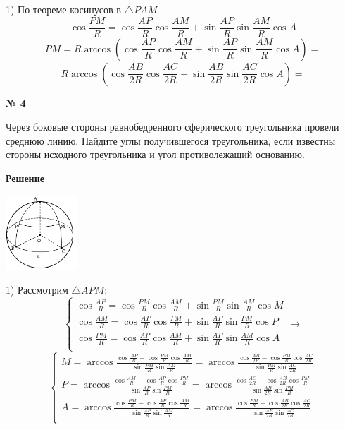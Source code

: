     1) По теореме косинусов в $\triangle PAM$
    \[
        \cos \frac{PM}{R} = \cos \frac{AP}{R}\cos\frac{AM}{R} + \sin\frac{AP}{R}\sin\frac{AM}{R}\cos A
    \]
    \[
        PM = R\arccos \left(\cos \frac{AP}{R}\cos\frac{AM}{R} + \sin\frac{AP}{R}\sin\frac{AM}{R}\cos A\right) =
    \]
    \[
        R\arccos \left(\cos \frac{AB}{2R}\cos\frac{AC}{2R} + \sin\frac{AB}{2R}\sin\frac{AC}{2R}\cos A\right) =
    \]

    \begin{center}
        \textbf{№ 4}
    \end{center}

    Через боковые стороны равнобедренного сферического треугольника провели среднюю линию.
    Найдите углы получившегося треугольника, если известны стороны исходного треугольника и угол противолежащий основанию.

    \textbf{Решение}\\

    \begin{center}
        \includegraphics[width=0.2\textwidth]{images/img6}\\
    \end{center}

    1) Рассмотрим $\triangle APM$:
    \[
        \begin{cases}
            \cos \frac{AP}{R} = \cos \frac{PM}{R}\cos\frac{AM}{R} + \sin \frac{PM}{R}\sin\frac{AM}{R}\cos M\\
            \cos \frac{AM}{R} = \cos \frac{AP}{R}\cos\frac{PM}{R} + \sin \frac{AP}{R}\sin\frac{PM}{R}\cos P\\
            \cos \frac{PM}{R} = \cos \frac{AP}{R}\cos\frac{AM}{R} + \sin \frac{AP}{R}\sin\frac{AM}{R}\cos A\\
        \end{cases}
        \rightarrow
    \]
    \[
        \begin{cases}
            M = \arccos \frac{\cos \frac{AP}{R} - \cos \frac{PM}{R}\cos\frac{AM}{R}}{\sin \frac{PM}{R}\sin\frac{AM}{R}}=
            \arccos \frac{\cos \frac{AB}{2R} - \cos \frac{PM}{R}\cos\frac{AC}{2R}}{\sin \frac{PM}{R}\sin\frac{AC}{2R}}\\
            P = \arccos \frac{\cos \frac{AM}{R} -  \cos \frac{AP}{R}\cos\frac{PM}{R}}{\sin \frac{AP}{R}\sin\frac{PM}{R}}=
            \arccos \frac{\cos \frac{AC}{2R} -  \cos \frac{AB}{2R}\cos\frac{PM}{R}}{\sin \frac{AB}{2R}\sin\frac{PM}{R}}\\
            A = \arccos \frac{\cos \frac{PM}{R} - \cos \frac{AP}{R}\cos\frac{AM}{R}}{\sin \frac{AP}{R}\sin\frac{AM}{R}}=
            \arccos \frac{\cos \frac{PM}{R} - \cos \frac{AB}{2R}\cos\frac{AC}{2R}}{\sin \frac{AB}{2R}\sin\frac{AC}{2R}}\\
        \end{cases}
    \]

